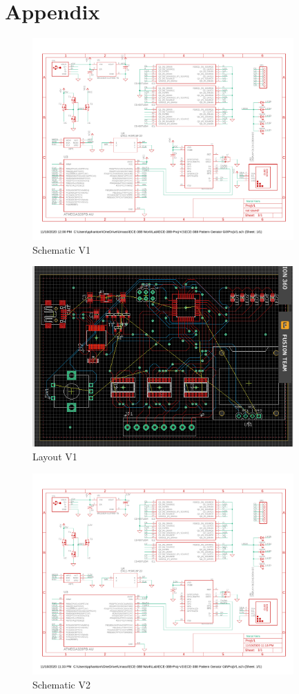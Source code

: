 \documentclass[12pt]{article}
\begin{document}
\section{Appendix}

\begin{figure}[htp]
    \centering
    \includegraphics[width=10cm]{ProjV1.pdf}
    \caption{Schematic V1}
\end{figure}

\begin{figure}[htp]
    \centering
    \includegraphics[width=10cm]{LayoutV1.png}
    \caption{Layout V1}
\end{figure}

\begin{figure}[htp]
    \centering
    \includegraphics[width=10cm]{ProjV2.pdf}
    \caption{Schematic V2}
\end{figure}
\end{document}
